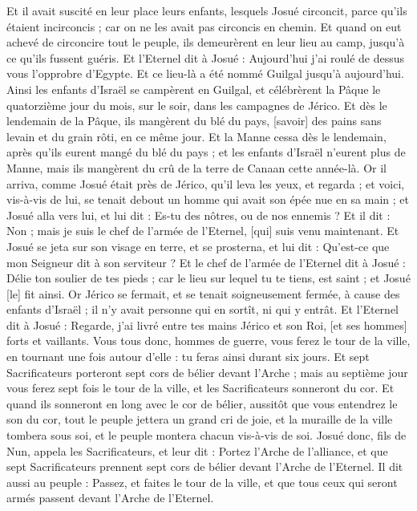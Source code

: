 \begin{multicols}{2}
Et il avait suscité en leur place leurs enfants, lesquels Josué circoncit, parce qu'ils étaient incirconcis ; car on ne les avait pas circoncis en chemin.
Et quand on eut achevé de circoncire tout le peuple, ils demeurèrent en leur lieu au camp, jusqu'à ce qu'ils fussent guéris.
Et l'Eternel dit à Josué : Aujourd'hui j'ai roulé de dessus vous l'opprobre d'Egypte. Et ce lieu-là a été nommé Guilgal jusqu'à aujourd'hui.
Ainsi les enfants d'Israël se campèrent en Guilgal, et célébrèrent la Pâque le quatorzième jour du mois, sur le soir, dans les campagnes de Jérico.
Et dès le lendemain de la Pâque, ils mangèrent du blé du pays, [savoir] des pains sans levain et du grain rôti, en ce même jour.
Et la Manne cessa dès le lendemain, après qu'ils eurent mangé du blé du pays ; et les enfants d'Israël n'eurent plus de Manne, mais ils mangèrent du crû de la terre de Canaan cette année-là.
Or il arriva, comme Josué était près de Jérico, qu'il leva les yeux, et regarda ; et voici, vis-à-vis de lui, se tenait debout un homme qui avait son épée nue en sa main ; et Josué alla vers lui, et lui dit : Es-tu des nôtres, ou de nos ennemis ?
Et il dit : Non ; mais je suis le chef de l'armée de l'Eternel, [qui] suis venu maintenant. Et Josué se jeta sur son visage en terre, et se prosterna, et lui dit : Qu'est-ce que mon Seigneur dit à son serviteur ?
Et le chef de l'armée de l'Eternel dit à Josué : Délie ton soulier de tes pieds ; car le lieu sur lequel tu te tiens, est saint ; et Josué [le] fit ainsi.
\VerseOne{}Or Jérico se fermait, et se tenait soigneusement fermée, à cause des enfants d'Israël ; il n'y avait personne qui en sortît, ni qui y entrât.
Et l'Eternel dit à Josué : Regarde, j'ai livré entre tes mains Jérico et son Roi, [et ses hommes] forts et vaillants.
Vous tous donc, hommes de guerre, vous ferez le tour de la ville, en tournant une fois autour d'elle : tu feras ainsi durant six jours.
Et sept Sacrificateurs porteront sept cors de bélier devant l'Arche ; mais au septième jour vous ferez sept fois le tour de la ville, et les Sacrificateurs sonneront du cor.
Et quand ils sonneront en long avec le cor de bélier, aussitôt que vous entendrez le son du cor, tout le peuple jettera un grand cri de joie, et la muraille de la ville tombera sous soi, et le peuple montera chacun vis-à-vis de soi.
Josué donc, fils de Nun, appela les Sacrificateurs, et leur dit : Portez l'Arche de l'alliance, et que sept Sacrificateurs prennent sept cors de bélier devant l'Arche de l'Eternel.
Il dit aussi au peuple : Passez, et faites le tour de la ville, et que tous ceux qui seront armés passent devant l'Arche de l'Eternel.

\end{multicols}
